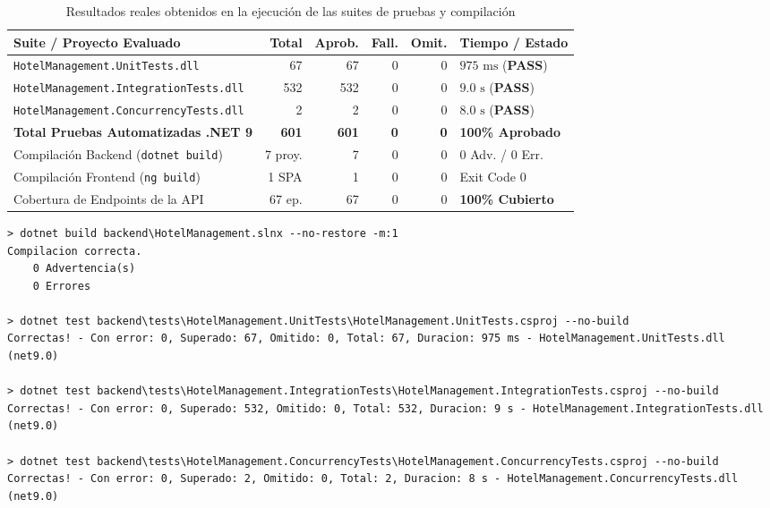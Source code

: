 \documentclass[12pt,a4paper]{article}
\begin{document}
\begin{table}[H]
\centering
\caption{Resultados reales obtenidos en la ejecuci\'on de las suites de pruebas y compilaci\'on}
\label{tab:resumen_ejecucion_pruebas}
\begin{tabular}{p{5.8cm} r r r r p{2.2cm}}
\toprule
\textbf{Suite / Proyecto Evaluado} & \textbf{Total} & \textbf{Aprob.} & \textbf{Fall.} & \textbf{Omit.} & \textbf{Tiempo / Estado}\\
\midrule
\texttt{HotelManagement.UnitTests.dll} & 67 & 67 & 0 & 0 & $975\text{ ms}$ (\textbf{PASS})\\
\texttt{HotelManagement.IntegrationTests.dll} & 532 & 532 & 0 & 0 & $9.0\text{ s}$ (\textbf{PASS})\\
\texttt{HotelManagement.ConcurrencyTests.dll} & 2 & 2 & 0 & 0 & $8.0\text{ s}$ (\textbf{PASS})\\
\midrule
\textbf{Total Pruebas Automatizadas .NET 9} & \textbf{601} & \textbf{601} & \textbf{0} & \textbf{0} & \textbf{100\% Aprobado}\\
\midrule
Compilaci\'on Backend (\texttt{dotnet build}) & 7 proy. & 7 & 0 & 0 & 0 Adv. / 0 Err.\\
Compilaci\'on Frontend (\texttt{ng build}) & 1 SPA & 1 & 0 & 0 & Exit Code 0\\
Cobertura de Endpoints de la API & 67 ep. & 67 & 0 & 0 & \textbf{100\% Cubierto}\\
\bottomrule
\end{tabular}
\end{table}

\begin{lstlisting}[caption={Evidencia real de ejecuci\'on de los tres proyectos de pruebas con \texttt{dotnet test}}]
> dotnet build backend\HotelManagement.slnx --no-restore -m:1
Compilacion correcta.
    0 Advertencia(s)
    0 Errores

> dotnet test backend\tests\HotelManagement.UnitTests\HotelManagement.UnitTests.csproj --no-build
Correctas! - Con error: 0, Superado: 67, Omitido: 0, Total: 67, Duracion: 975 ms - HotelManagement.UnitTests.dll (net9.0)

> dotnet test backend\tests\HotelManagement.IntegrationTests\HotelManagement.IntegrationTests.csproj --no-build
Correctas! - Con error: 0, Superado: 532, Omitido: 0, Total: 532, Duracion: 9 s - HotelManagement.IntegrationTests.dll (net9.0)

> dotnet test backend\tests\HotelManagement.ConcurrencyTests\HotelManagement.ConcurrencyTests.csproj --no-build
Correctas! - Con error: 0, Superado: 2, Omitido: 0, Total: 2, Duracion: 8 s - HotelManagement.ConcurrencyTests.dll (net9.0)
\end{lstlisting}
\end{document}
